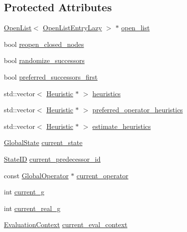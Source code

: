 \subsection*{Protected Attributes}
\begin{DoxyCompactItemize}
\item 
\hyperlink{classOpenList}{Open\-List}$<$ \hyperlink{lazy__search_8h_a1d8132fb7e600cfa9f52c42559750b5c}{Open\-List\-Entry\-Lazy} $>$ $\ast$ \hyperlink{classLazySearch_a67eadc9a21234e4aac2ea9fa8cfc3ef3}{open\-\_\-list}
\item 
bool \hyperlink{classLazySearch_a5d08aa7f2a8eb170ab0e32b006265218}{reopen\-\_\-closed\-\_\-nodes}
\item 
bool \hyperlink{classLazySearch_a3eeed1027fba7d23478de6a9ecc26988}{randomize\-\_\-successors}
\item 
bool \hyperlink{classLazySearch_a732a63ac9f996f5ff3e02b4b1283ac3a}{preferred\-\_\-successors\-\_\-first}
\item 
std\-::vector$<$ \hyperlink{classHeuristic}{Heuristic} $\ast$ $>$ \hyperlink{classLazySearch_a8252cee86ea2ca31fe4b7e2d35c2b952}{heuristics}
\item 
std\-::vector$<$ \hyperlink{classHeuristic}{Heuristic} $\ast$ $>$ \hyperlink{classLazySearch_a7f1e75bf8bbf159776ea65afe15110c2}{preferred\-\_\-operator\-\_\-heuristics}
\item 
std\-::vector$<$ \hyperlink{classHeuristic}{Heuristic} $\ast$ $>$ \hyperlink{classLazySearch_a0e6f2058093334ca068a87c828e77b32}{estimate\-\_\-heuristics}
\item 
\hyperlink{classGlobalState}{Global\-State} \hyperlink{classLazySearch_a18b13c44ec6b91896779eb41d26038cb}{current\-\_\-state}
\item 
\hyperlink{classStateID}{State\-I\-D} \hyperlink{classLazySearch_a39019af3180b660aa0c256fc0e51285b}{current\-\_\-predecessor\-\_\-id}
\item 
const \hyperlink{classGlobalOperator}{Global\-Operator} $\ast$ \hyperlink{classLazySearch_a928bb4390d1b061e2c1c6dd6588ed14d}{current\-\_\-operator}
\item 
int \hyperlink{classLazySearch_aa9a52970b26305529f0cc5e896f9111e}{current\-\_\-g}
\item 
int \hyperlink{classLazySearch_a7dfc150f2a8fcdbec91914f4ce2625f9}{current\-\_\-real\-\_\-g}
\item 
\hyperlink{classEvaluationContext}{Evaluation\-Context} \hyperlink{classLazySearch_a9d67f87af37f3deb2ca38ebc9eabb019}{current\-\_\-eval\-\_\-context}
\end{DoxyCompactItemize}
